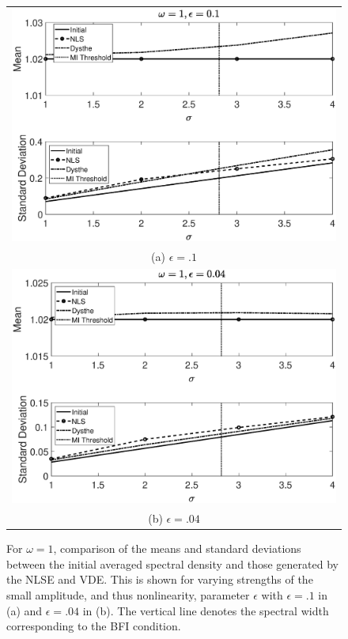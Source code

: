 \documentclass[a4paper,11pt]{article}
\begin{document}
\begin{figure}[!ht]
\centering
\begin{tabular}{c}
\includegraphics[width=.85\textwidth]{omega1_ep0pt1}\\
(a) $\epsilon=.1$ \\
\includegraphics[width=.85\textwidth]{omega1_ep0pt04}\\
(b) $\epsilon=.04$
\end{tabular}
\caption{For $\omega=1$, comparison of the means and standard deviations between the initial averaged spectral density and those generated by the NLSE and VDE.  This is shown for varying strengths of the small amplitude, and thus nonlinearity, parameter $\epsilon$ with $\epsilon=.1$ in (a) and $\epsilon=.04$ in (b).  The vertical line denotes the spectral width corresponding to the BFI condition.}
\label{fig:meanstdom1}
\end{figure}
\end{document}
